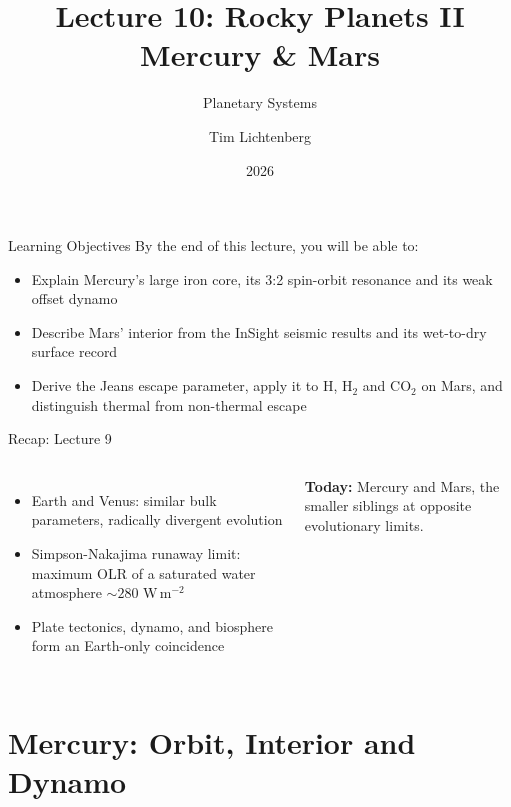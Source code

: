 \documentclass[aspectratio=169, 11pt]{beamer}
\title[Lecture 10: Mercury \& Mars]{Lecture 10: Rocky Planets II\\Mercury \& Mars}
\subtitle{Planetary Systems}
\author[L10]{Tim Lichtenberg}
\institute{Kapteyn Astronomical Institute\\University of Groningen}
\date{2026}
\begin{document}
\begin{frame}
  \titlepage
\end{frame}

\begin{frame}{Learning Objectives}
  By the end of this lecture, you will be able to:
  \vskip8pt
  \begin{itemize}
    \item Explain Mercury's large iron core, its 3:2 spin-orbit resonance and its weak offset dynamo
    \item Describe Mars' interior from the InSight seismic results and its wet-to-dry surface record
    \item Derive the Jeans escape parameter, apply it to H, $\mathrm{H_2}$ and $\mathrm{CO_2}$ on Mars, and distinguish thermal from non-thermal escape
  \end{itemize}
\end{frame}

\begin{frame}{Recap: Lecture 9}
  \begin{columns}[c]
    \column{\recapfigcol}

    \column{\recaptextcol}
    \begin{itemize}
      \item Earth and Venus: similar bulk parameters, radically divergent evolution
      \item Simpson-Nakajima runaway limit: maximum OLR of a saturated water atmosphere $\sim 280$ W\,m$^{-2}$
      \item Plate tectonics, dynamo, and biosphere form an Earth-only coincidence
    \end{itemize}
    \vskip8pt
    \textbf{Today:} Mercury and Mars, the smaller siblings at opposite evolutionary limits.
  \end{columns}
\end{frame}


\section{Mercury: Orbit, Interior and Dynamo}
\end{document}
